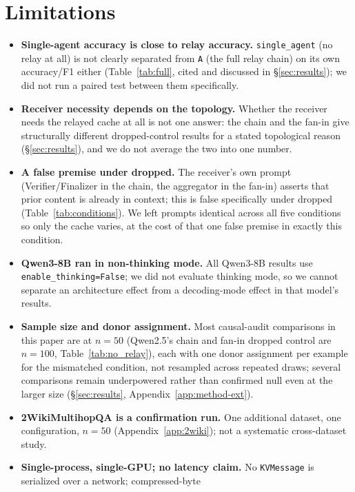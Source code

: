 \documentclass[11pt]{article}
\begin{document}
\section{Limitations}
\label{sec:limitations}

\begin{itemize}[leftmargin=*]
\item \textbf{Single-agent accuracy is close to relay accuracy.}
\texttt{single\_agent} (no relay at all) is not clearly separated from
\texttt{A} (the full relay chain) on its own accuracy/F1 either
(Table~\ref{tab:full}, cited and discussed in \S\ref{sec:results});
we did not run a paired test between them specifically.
\item \textbf{Receiver necessity depends on the topology.} Whether the
receiver needs the relayed cache at all is not one answer: the chain
and the fan-in give structurally different dropped-control results for
a stated topological reason (\S\ref{sec:results}), and we do not
average the two into one number.
\item \textbf{A false premise under dropped.} The receiver's own prompt
(Verifier/Finalizer in the chain, the aggregator in the fan-in) asserts
that prior content is already in context; this is false specifically
under dropped (Table~\ref{tab:conditions}). We left prompts identical
across all five conditions so only the cache varies, at the cost of
that one false premise in exactly this condition.
\item \textbf{Qwen3-8B ran in non-thinking mode.} All Qwen3-8B results
use \texttt{enable\_thinking=False}; we did not evaluate thinking mode,
so we cannot separate an architecture effect from a decoding-mode
effect in that model's results.
\item \textbf{Sample size and donor assignment.} Most causal-audit
comparisons in this paper are at $n=50$ (Qwen2.5's chain and fan-in
dropped control are $n=100$, Table~\ref{tab:no_relay}), each with one
donor assignment per example for the mismatched condition, not
resampled across repeated draws; several comparisons remain
underpowered rather than confirmed null even at the larger size
(\S\ref{sec:results}, Appendix~\ref{app:method-ext}).
\item \textbf{2WikiMultihopQA is a confirmation run.} One additional
dataset, one configuration, $n=50$ (Appendix~\ref{app:2wiki}); not a
systematic cross-dataset study.
\item \textbf{Single-process, single-GPU; no latency claim.} No
\texttt{KVMessage} is serialized over a network; compressed-byte

\end{itemize}
\end{document}
